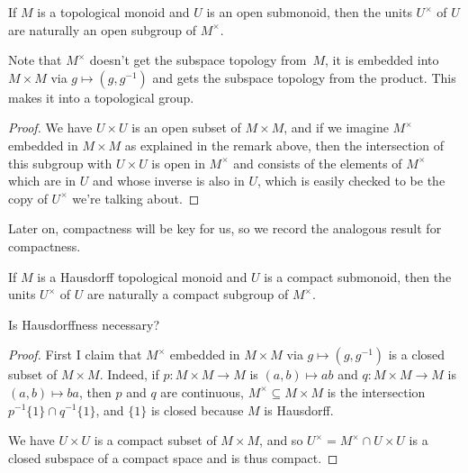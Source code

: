 \begin{lemma}
  \label{Submonoid.units_isOpen}
  \leanok
  If $M$ is a topological monoid and $U$ is an open submonoid, then
  the units $U^\times$ of $U$ are naturally an open subgroup of $M^\times$.
\end{lemma}
\begin{remark} Note that $M^\times$ doesn't get the subspace topology from~$M$,
  it is embedded into $M\times M$ via $g\mapsto (g,g^{-1})$ and gets the subspace
  topology from the product. This makes it into a topological group.
\end{remark}
\begin{proof}
  We have $U\times U$ is an open subset of $M\times M$, and if we imagine $M^\times$
  embedded in $M\times M$ as explained in the remark above, then the intersection
  of this subgroup with $U\times U$ is open in $M^\times$ and consists of the elements
  of $M^\times$ which are in $U$ and whose inverse is also in $U$, which is easily
  checked to be the copy of $U^\times$ we're talking about.
\end{proof}

Later on, compactness will be key for us, so we record the analogous result
for compactness.

\begin{lemma}
  \label{Submonoid.units_isCompact}
  \leanok
  If $M$ is a Hausdorff topological monoid and $U$ is a compact submonoid,
  then the units $U^\times$ of $U$ are naturally a compact subgroup of $M^\times$.
\end{lemma}
\begin{remark} Is Hausdorffness necessary?
\end{remark}
\begin{proof}
  First I claim that $M^\times$ embedded in $M\times M$ via $g\mapsto (g,g^{-1})$
  is a closed subset of $M\times M$. Indeed, if $p:M\times M\to M$ is $(a,b)\mapsto ab$
  and $q:M\times M\to M$ is $(a,b)\mapsto ba$, then $p$ and $q$ are continuous,
  $M^\times\subseteq M\times M$ is the intersection
  $p^{-1}\{1\}\cap q^{-1}\{1\}$, and $\{1\}$ is closed because $M$ is Hausdorff.

  We have $U\times U$ is a compact subset of $M\times M$, and so
  $U^\times=M^\times\cap U\times U$ is a closed subspace of a compact space
  and is thus compact.
\end{proof}

